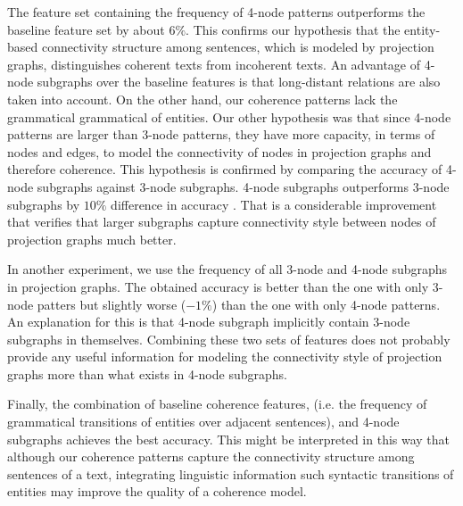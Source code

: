The feature set containing the frequency of 4-node patterns outperforms the baseline feature set by about $6\%$. 
This confirms our hypothesis that the entity-based connectivity structure among sentences, which is modeled by projection graphs, distinguishes coherent texts from incoherent texts. 
An advantage of 4-node subgraphs over the baseline features is that long-distant relations are also taken into account. 
On the other hand, our coherence patterns lack the grammatical grammatical of entities. 
Our other hypothesis was that since 4-node patterns are larger than 3-node patterns, they have more capacity, in terms of nodes and edges, to model the connectivity of nodes in projection graphs and therefore coherence. 
This hypothesis is confirmed by comparing the accuracy of 4-node subgraphs against 3-node subgraphs.
4-node subgraphs outperforms 3-node subgraphs by $10\%$ difference in accuracy . 
That is a considerable improvement that verifies that larger subgraphs capture connectivity style between nodes of projection graphs much better.   

In another experiment, we use the frequency of all 3-node and 4-node subgraphs in projection graphs. 
The obtained accuracy is better than the one with only 3-node patters but slightly worse  ($-1\%$) than the one with only 4-node patterns. 
An explanation for this is that 4-node subgraph implicitly contain 3-node subgraphs in themselves. 
Combining these two sets of features does not probably provide any useful information for modeling the connectivity style of projection graphs more than what exists in 4-node subgraphs. 

Finally, the combination of baseline coherence features, (i.e. the frequency of grammatical transitions of entities over adjacent sentences), and 4-node subgraphs achieves the best accuracy. 
This might be interpreted in this way that although our coherence patterns capture the connectivity structure among sentences of a text, integrating linguistic information such syntactic transitions of entities may improve the quality of a coherence model.  



